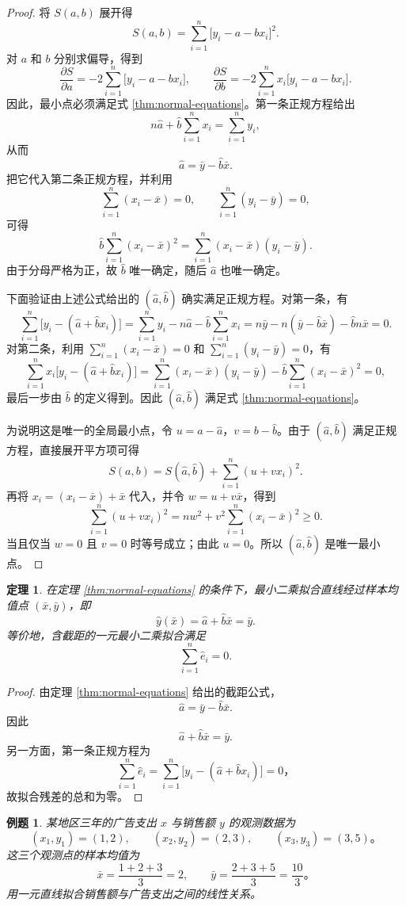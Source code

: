 \documentclass[UTF8,fontset=fandol,11pt]{ctexart}
\newtheorem{theorem}[definition]{定理}
\newtheorem{example}[definition]{例题}
\begin{document}
\begin{proof}
将 $S(a,b)$ 展开得
\[
S(a,b)=\sum_{i=1}^{n}\bigl[y_i-a-bx_i\bigr]^2.
\]
对 $a$ 和 $b$ 分别求偏导，得到
\[
\frac{\partial S}{\partial a}=-2\sum_{i=1}^{n}\bigl[y_i-a-bx_i\bigr],
\qquad
\frac{\partial S}{\partial b}=-2\sum_{i=1}^{n}x_i\bigl[y_i-a-bx_i\bigr].
\]
因此，最小点必须满足式 \eqref{thm:normal-equations}。第一条正规方程给出
\[
n\hat a+\hat b\sum_{i=1}^{n}x_i=\sum_{i=1}^{n}y_i,
\]
从而
\[
\hat a=\bar y-\hat b\bar x.
\]
把它代入第二条正规方程，并利用
\[
\sum_{i=1}^{n}(x_i-\bar x)=0,
\qquad
\sum_{i=1}^{n}(y_i-\bar y)=0,
\]
可得
\[
\hat b\sum_{i=1}^{n}(x_i-\bar x)^2
=\sum_{i=1}^{n}(x_i-\bar x)(y_i-\bar y).
\]
由于分母严格为正，故 $\hat b$ 唯一确定，随后 $\hat a$ 也唯一确定。

下面验证由上述公式给出的 $(\hat a,\hat b)$ 确实满足正规方程。对第一条，有
\[
\sum_{i=1}^{n}\bigl[y_i-(\hat a+\hat b x_i)\bigr]
=\sum_{i=1}^{n}y_i-n\hat a-\hat b\sum_{i=1}^{n}x_i
=n\bar y-n(\bar y-\hat b\bar x)-\hat b n\bar x=0.
\]
对第二条，利用 $\sum_{i=1}^{n}(x_i-\bar x)=0$ 和 $\sum_{i=1}^{n}(y_i-\bar y)=0$，有
\[
\sum_{i=1}^{n}x_i\bigl[y_i-(\hat a+\hat b x_i)\bigr]
=\sum_{i=1}^{n}(x_i-\bar x)(y_i-\bar y)
-\hat b\sum_{i=1}^{n}(x_i-\bar x)^2=0,
\]
最后一步由 $\hat b$ 的定义得到。因此 $(\hat a,\hat b)$ 满足式 \eqref{thm:normal-equations}。

为说明这是唯一的全局最小点，令 $u=a-\hat a$，$v=b-\hat b$。由于 $(\hat a,\hat b)$ 满足正规方程，直接展开平方项可得
\[
S(a,b)=S(\hat a,\hat b)+\sum_{i=1}^{n}(u+vx_i)^2.
\]
再将 $x_i=(x_i-\bar x)+\bar x$ 代入，并令 $w=u+v\bar x$，得到
\[
\sum_{i=1}^{n}(u+vx_i)^2
=nw^2+v^2\sum_{i=1}^{n}(x_i-\bar x)^2\geq 0.
\]
当且仅当 $w=0$ 且 $v=0$ 时等号成立；由此 $u=0$。所以 $(\hat a,\hat b)$ 是唯一最小点。
\end{proof}
\begin{theorem}
在定理 \eqref{thm:normal-equations} 的条件下，最小二乘拟合直线经过样本均值点 $(\bar x,\bar y)$，即
\[
\hat y(\bar x)=\hat a+\hat b\bar x=\bar y.
\]
等价地，含截距的一元最小二乘拟合满足
\[
\sum_{i=1}^{n}\hat e_i=0.
\]
\end{theorem}
\begin{proof}
由定理 \eqref{thm:normal-equations} 给出的截距公式，
\[
\hat a=\bar y-\hat b\bar x.
\]
因此
\[
\hat a+\hat b\bar x=\bar y.
\]
另一方面，第一条正规方程为
\[
\sum_{i=1}^{n}\hat e_i=\sum_{i=1}^{n}\bigl[y_i-(\hat a+\hat b x_i)\bigr]=0\text{，}
\]
故拟合残差的总和为零。
\end{proof}
\begin{example}
某地区三年的广告支出 $x$ 与销售额 $y$ 的观测数据为
\[
(x_1,y_1)=(1,2),\qquad (x_2,y_2)=(2,3),\qquad (x_3,y_3)=(3,5)\text{。}
\]
这三个观测点的样本均值为
\[
\bar x=\frac{1+2+3}{3}=2,\qquad \bar y=\frac{2+3+5}{3}=\frac{10}{3}\text{。}
\]
用一元直线拟合销售额与广告支出之间的线性关系。
\end{example}
\end{document}

